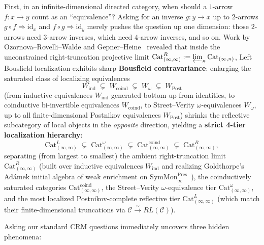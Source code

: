 \documentclass[10pt,twoside,openright]{book}
\theoremstyle{crmplain}
\theoremstyle{crmdef}
\theoremstyle{crmremark}
\begin{document}
First, in an infinite-dimensional directed category, when should a $1$-arrow $f : x \to y$ count as an ``equivalence''? Asking for an inverse $g : y \to x$ up to $2$-arrows $g \circ f \Rightarrow \mathrm{id}_x$ and $f \circ g \Rightarrow \mathrm{id}_y$ merely pushes the question up one dimension: those $2$-arrows need $3$-arrow inverses, which need $4$-arrow inverses, and so on. Work by Ozornova--Rovelli--Walde and Gepner--Heine~\cite{ORW26,GepnerHeine26} revealed that inside the unconstrained right-truncation projective limit $\mathrm{Cat}^R_{(\infty,\infty)} := \varprojlim_\kappa \mathrm{Cat}_{(\infty, n)}$, Left Bousfield localization exhibits sharp \textbf{Bousfield contravariance}: enlarging the saturated class of localizing equivalences
\[
  W_{\mathrm{ind}} \;\subsetneq\; W_{\mathrm{coind}} \;\subsetneq\; W_\omega \;\subsetneq\; W_{\mathrm{Post}}
\]
(from inductive equivalences $W_{\mathrm{ind}}$ generated bottom-up from identities, to coinductive bi-invertible equivalences $W_{\mathrm{coind}}$, to Street--Verity $\omega$-equivalences $W_\omega$, up to all finite-dimensional Postnikov equivalences $W_{\mathrm{Post}}$) shrinks the reflective subcategory of local objects in the \emph{opposite} direction, yielding a \textbf{strict 4-tier localization hierarchy}:
\[
  \mathrm{Cat}^L_{(\infty,\infty)} \;\subsetneq\; \mathrm{Cat}^\omega_{(\infty,\infty)} \;\subsetneq\; \mathrm{Cat}^{\mathrm{coind}}_{(\infty,\infty)} \;\subsetneq\; \mathrm{Cat}^R_{(\infty,\infty)},
\]
separating (from largest to smallest) the ambient right-truncation limit $\mathrm{Cat}^R_{(\infty,\infty)}$ (built over inductive equivalences $W_{\mathrm{ind}}$ and realizing Goldthorpe's Ad\'amek initial algebra of weak enrichment on $\mathrm{SymMon}^{\mathrm{Pres}}_\infty$~\cite[Theorem~3.3.5]{Goldthorpe23}), the coinductively saturated categories $\mathrm{Cat}^{\mathrm{coind}}_{(\infty,\infty)}$, the Street--Verity $\omega$-equivalence tier $\mathrm{Cat}^\omega_{(\infty,\infty)}$, and the most localized Postnikov-complete reflective tier $\mathrm{Cat}^L_{(\infty,\infty)}$ (which match their finite-dimensional truncations via $\mathcal{C} \xrightarrow{\sim} RL(\mathcal{C})$).

Asking our standard CRM questions immediately uncovers three hidden phenomena:
\end{document}
